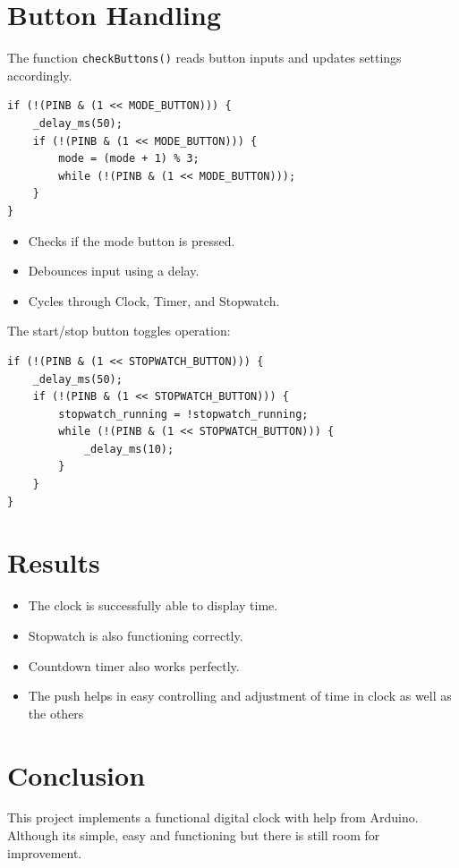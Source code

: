 \documentclass[a4paper,12pt]{article}
\begin{document}
\section*{Button Handling}
The function \texttt{checkButtons()} reads button inputs and updates settings accordingly.

\begin{lstlisting}
if (!(PINB & (1 << MODE_BUTTON))) {
    _delay_ms(50);
    if (!(PINB & (1 << MODE_BUTTON))) {
        mode = (mode + 1) % 3; 
        while (!(PINB & (1 << MODE_BUTTON)));
    }
}
\end{lstlisting}

\begin{itemize}
    \item Checks if the mode button is pressed.
    \item Debounces input using a delay.
    \item Cycles through Clock, Timer, and Stopwatch.
\end{itemize}

The start/stop button toggles operation:

\begin{lstlisting}
if (!(PINB & (1 << STOPWATCH_BUTTON))) {
    _delay_ms(50);
    if (!(PINB & (1 << STOPWATCH_BUTTON))) {
        stopwatch_running = !stopwatch_running;
        while (!(PINB & (1 << STOPWATCH_BUTTON))) {
            _delay_ms(10);
        }
    }
}
\end{lstlisting}

\section{Results}
\begin{itemize}
    \item The clock is successfully able to display time.
    \item Stopwatch is also functioning correctly.
    \item Countdown timer also works perfectly.
    \item The push helps in easy controlling and adjustment of time in clock as well as the others     
\end{itemize}

\section{Conclusion}
This project implements a functional digital clock with help from Arduino. Although its simple, easy and functioning but there is still room for improvement.
\end{document}
